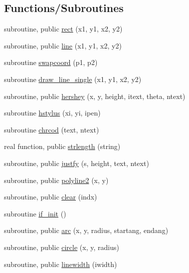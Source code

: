 \subsection*{Functions/\+Subroutines}
\begin{DoxyCompactItemize}
\item 
subroutine, public \mbox{\hyperlink{namespacem__pixel_a5435aa0d9d6048a62c09d7d90665b958}{rect}} (x1, y1, x2, y2)
\item 
subroutine, public \mbox{\hyperlink{namespacem__pixel_a491951b89e60d0d40d67f22d987da894}{line}} (x1, y1, x2, y2)
\item 
subroutine \mbox{\hyperlink{namespacem__pixel_a063f74c3dd2f7f086dc47ec68abc22c9}{swapcoord}} (p1, p2)
\item 
subroutine \mbox{\hyperlink{namespacem__pixel_a42791c7e58158616dae7c36ec5806717}{draw\+\_\+line\+\_\+single}} (x1, y1, x2, y2)
\item 
subroutine, public \mbox{\hyperlink{namespacem__pixel_a80dc3cb149287470a9837de8dd3f05bc}{hershey}} (x, y, height, itext, theta, ntext)
\item 
subroutine \mbox{\hyperlink{namespacem__pixel_a15c5daa9ab477991c2c6e17741cf40eb}{hstylus}} (xi, yi, ipen)
\item 
subroutine \mbox{\hyperlink{namespacem__pixel_ab25c6cce708ff91a79bbabb23d591a8b}{chrcod}} (text, ntext)
\item 
real function, public \mbox{\hyperlink{namespacem__pixel_a0468f8d9308bade7f8f2a68a133271d2}{strlength}} (string)
\item 
subroutine, public \mbox{\hyperlink{namespacem__pixel_a7b08886c913b47694edeb60fa747afc4}{justfy}} (s, height, text, ntext)
\item 
subroutine, public \mbox{\hyperlink{namespacem__pixel_a0678be124889fb633475a6724ddb6640}{polyline2}} (x, y)
\item 
subroutine, public \mbox{\hyperlink{namespacem__pixel_af3b81a21a0b2f6b5eddd09c031bd6173}{clear}} (indx)
\item 
subroutine \mbox{\hyperlink{namespacem__pixel_a6c23c2779e54da4ac7505cfb816cc2b1}{if\+\_\+init}} ()
\item 
subroutine, public \mbox{\hyperlink{namespacem__pixel_ab881b9c2adff081a086cd83a1f1341fb}{arc}} (x, y, radius, startang, endang)
\item 
subroutine, public \mbox{\hyperlink{namespacem__pixel_ab3b12cc498ed490014aa5fcc0bb278d2}{circle}} (x, y, radius)
\item 
subroutine, public \mbox{\hyperlink{namespacem__pixel_a16379e283aaa99e2e0ba1eb26e93452d}{linewidth}} (iwidth)

\end{DoxyCompactItemize}
